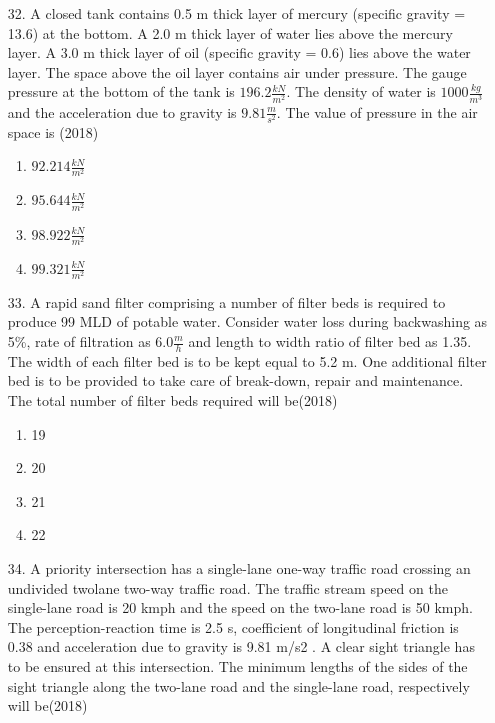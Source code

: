 \documentclass[journal]{IEEEtran}
\begin{document}
\begin{enumerate}
    \item[32.] A closed tank contains 0.5 m thick layer of mercury (specific gravity = 13.6) at the bottom.
    A 2.0 m thick layer of water lies above the mercury layer. A 3.0 m thick layer of oil
    (specific gravity = 0.6) lies above the water layer. The space above the oil layer contains
    air under pressure. The gauge pressure at the bottom of the tank is $196.2 \frac{kN}{m^2}$. The density of water is $1000 \frac{kg}{m^3}$
    and the acceleration due to gravity is $9.81 \frac{m}{s^2}$. The value
    of pressure in the air space is \hfill (2018)
    \begin{enumerate}[label=(\Alph*)]
        \item $92.214 \frac{kN}{m^2}$
        \item $95.644 \frac{kN}{m^2}$
        \item $98.922 \frac{kN}{m^2}$
        \item $99.321 \frac{kN}{m^2}$
    \end{enumerate} 
    \item[33.] A rapid sand filter comprising a number of filter beds is required to produce 99 MLD of
    potable water. Consider water loss during backwashing as 5\%, rate of filtration as $6.0 \frac{m}{h}$
    and length to width ratio of filter bed as 1.35. The width of each filter bed is to be kept
    equal to 5.2 m. One additional filter bed is to be provided to take care of break-down,
    repair and maintenance. The total number of filter beds required will be\hfill (2018)
    \begin{enumerate}[label=(\Alph*)]
        \item 19
        \item 20
        \item 21
        \item 22
    \end{enumerate}
    \item[34.] A priority intersection has a single-lane one-way traffic road crossing an undivided twolane two-way traffic road. The traffic stream speed on the single-lane road is 20 kmph and
    the speed on the two-lane road is 50 kmph. The perception-reaction time is 2.5 s, coefficient of longitudinal friction is 0.38 and acceleration due to gravity is 9.81 m/s2
    . A clear sight triangle has to be ensured at this intersection. The minimum lengths of the sides
    of the sight triangle along the two-lane road and the single-lane road, respectively will be\hfill (2018)
    \begin{enumerate}[label=(\Alph*)]

\end{enumerate}
\end{enumerate}
\end{document}
